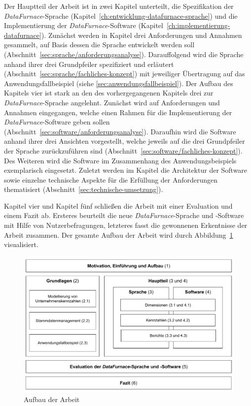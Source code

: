 \documentclass[
  language=german, %
  type=bachelor,%
  ngerman
]{isthesis}
\begin{document}
\begin{content}
  Der Hauptteil der Arbeit ist in zwei Kapitel unterteilt, die Spezifikation
  der \textit{DataFurnace}-Sprache
  (Kapitel~\ref{ch:entwicklung-datafurnace-sprache}) und die Implementierung
  der \textit{DataFurnace}-Software
  (Kapitel~\ref{ch:implementierung-datafurnace}). Zunächst werden in
  Kapitel drei Anforderungen und Annahmen gesammelt, auf Basis dessen die
  Sprache entwickelt werden soll
  (Abschnitt~\ref{sec:sprache/anforderungsanalyse}). Darauffolgend wird die
  Sprache anhand ihrer drei Grundpfeiler spezifiziert und erläutert
  (Abschnitt~\ref{sec:sprache/fachliches-konzept}) mit jeweiliger Übertragung
  auf das Anwendungsfallbeispiel (siehe \cref{sec:anwendungsfallbeispiel}).  Der
  Aufbau des Kapitels vier ist stark an den des vorhergegangenen Kapitels drei
  zur \textit{DataFurnace}-Sprache angelehnt. Zunächst wird auf Anforderungen
  und Annahmen eingegangen, welche einen Rahmen für die Implementierung der
  \textit{DataFurnace}-Software geben sollen
  (Abschnitt~\ref{sec:software/anforderungsanalyse}). Daraufhin wird die Software
  anhand ihrer drei Ansichten vorgestellt, welche jeweils auf die drei
  Grundpfeiler der Sprache zurückzuführen sind
  (Abschnitt~\ref{sec:software/fachliches-konzept}). Des Weiteren wird die
  Software im Zusammenhang des Anwendungsbeispiels exemplarisch eingesetzt.
  Zuletzt werden im Kapitel die Architektur der Software sowie einzelne
  technische Aspekte für die Erfüllung der Anforderungen thematisiert
  (Abschnitt~\ref{sec:technische-umsetzung}).

  Kapitel vier und Kapitel fünf schließen die Arbeit mit einer Evaluation und
  einem Fazit ab. Ersteres beurteilt die neue \textit{DataFurnace}-Sprache und
  -Software mit Hilfe von Nutzerbefragungen, letzteres
  fasst die gewonnenen Erkentnisse der Arbeit zusammen.  Der gesamte Aufbau der
  Arbeit wird durch Abbildung~\ref{fig:thesis-structure}
  visualisiert.

  \begin{figure}
    \includegraphics[scale=0.70]{content/figures/thesis-structure}
    \caption{Aufbau der Arbeit}\label{fig:thesis-structure}
  \end{figure}




\end{content}
\end{document}
